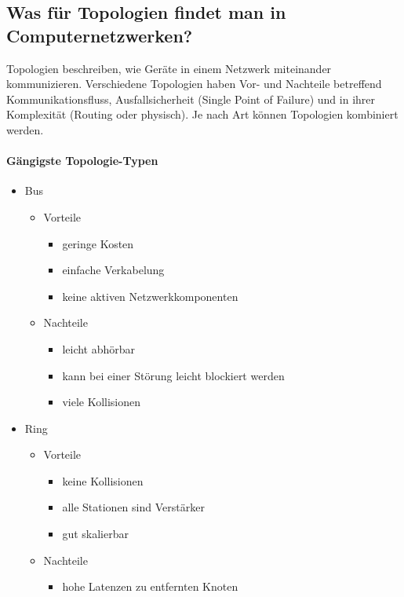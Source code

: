\subsection*{Was für Topologien findet man in Computernetzwerken?}
Topologien beschreiben, wie Geräte in einem Netzwerk miteinander kommunizieren. Verschiedene Topologien haben Vor- und Nachteile betreffend Kommunikationsfluss, Ausfallsicherheit (Single Point of Failure) und in ihrer Komplexität (Routing oder physisch). Je nach Art können Topologien kombiniert werden.

\paragraph*{Gängigste Topologie-Typen}
\begin{itemize}
    \item Bus
    \begin{itemize}
        \item Vorteile
        \begin{itemize}
            \item geringe Kosten
            \item einfache Verkabelung
            \item keine aktiven Netzwerkkomponenten
        \end{itemize}
        \item Nachteile
        \begin{itemize}
            \item leicht abhörbar
            \item kann bei einer Störung leicht blockiert werden
            \item viele Kollisionen
        \end{itemize}
    \end{itemize}
    \item Ring
    \begin{itemize}
        \item Vorteile
        \begin{itemize}
            \item keine Kollisionen
            \item alle Stationen sind Verstärker
            \item gut skalierbar
        \end{itemize}
        \item Nachteile
        \begin{itemize}
            \item hohe Latenzen zu entfernten Knoten

\end{itemize}
\end{itemize}
\end{itemize}
